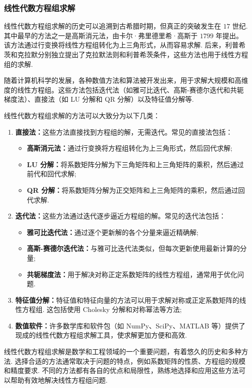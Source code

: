         \subsubsection{线性代数方程组求解}
            \par 线性代数方程组求解的历史可以追溯到古希腊时期，但真正的突破发生在 $17$ 世纪. 其中最早的方法之一是高斯消元法，由卡尔·弗里德里希·高斯于 $1799$ 年提出。该方法通过行变换将线性方程组转化为上三角形式，从而容易求解. 后来，利普希茨和克拉默分别独立提出了克拉默法则和利普希茨条件，这些方法也用于线性方程组的求解.
            \par 随着计算机科学的发展，各种数值方法和算法被开发出来，用于求解大规模和高维度的线性方程组。这些方法包括迭代法（如雅可比迭代、高斯-赛德尔迭代和共轭梯度法）、直接法（如 LU 分解和 QR 分解）以及特征值分解等.
            \par 线性代数方程组求解的方法可以大致分为以下几类：
            \begin{enumerate}
                \item \textbf{直接法：}这些方法直接找到方程组的解，无需迭代。常见的直接法包括：
                    \begin{itemize}
                        \item \textbf{高斯消元法：}通过行变换将方程组转化为上三角形式，然后回代求解;
                        \item \textbf{LU 分解：}将系数矩阵分解为下三角矩阵和上三角矩阵的乘积，然后通过前代和回代求解;
                        \item \textbf{QR 分解：}将系数矩阵分解为正交矩阵和上三角矩阵的乘积，然后通过回代求解.
                    \end{itemize}
                \item \textbf{迭代法：}这些方法通过迭代逐步逼近方程组的解。常见的迭代法包括：
                    \begin{itemize}
                        \item \textbf{雅可比迭代法：}通过逐个更新解的各个分量来逼近精确解;
                        \item \textbf{高斯-赛德尔迭代法：}与雅可比迭代法类似，但每次更新使用最新计算的分量;
                        \item \textbf{共轭梯度法：}用于解决对称正定系数矩阵的线性方程组，通常用于优化问题.
                    \end{itemize}
                \item \textbf{特征值分解：}特征值和特征向量的方法可以用于求解对称或正定系数矩阵的线性方程组. 这包括使用 Cholesky 分解和对称幂法等方法;
                \item \textbf{数值软件：}许多数学库和软件包（如 NumPy、SciPy、MATLAB 等）提供了现成的线性代数方程组求解工具，使求解更加方便和高效.
            \end{enumerate}
            \par 线性代数方程组求解是数学和工程领域的一个重要问题，有着悠久的历史和多种方法. 选择合适的方法通常取决于问题的特点，例如系数矩阵的性质、方程组的规模和精度要求. 不同的方法都有各自的优点和局限性，熟练地选择和应用这些方法可以帮助有效地解决线性方程组问题.
        
